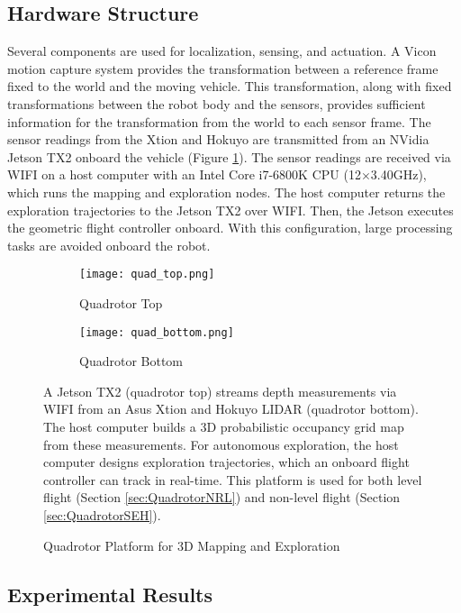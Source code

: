 \subsection{Hardware Structure}

Several components are used for localization, sensing, and actuation. A Vicon motion capture system provides the transformation between a reference frame fixed to the world and the moving vehicle. This transformation, along with fixed transformations between the robot body and the sensors, provides sufficient information for the transformation from the world to each sensor frame. The sensor readings from the Xtion and Hokuyo are transmitted from an NVidia Jetson TX2 onboard the vehicle (Figure \ref{fig:QuadrotorHardware}). The sensor readings are received via WIFI on a host computer with an Intel Core i7-6800K CPU (12$\times$3.40GHz), which runs the mapping and exploration nodes. The host computer returns the exploration trajectories to the Jetson TX2 over WIFI. Then, the Jetson executes the geometric flight controller onboard. With this configuration, large processing tasks are avoided onboard the robot.
		
\begin{figure}[!t]
\centering
    	\begin{subfigure}[t]{0.44\columnwidth}
           	\centering
          	\texttt{[image: quad\_top.png]}
        		\caption{Quadrotor Top}
    	\end{subfigure}
	\hspace*{0.05\columnwidth}
    	\begin{subfigure}[t]{0.44\columnwidth}
           	\centering
          	\texttt{[image: quad\_bottom.png]}
        		\caption{Quadrotor Bottom}
    	\end{subfigure}
	\caption{Quadrotor Platform for 3D Mapping and Exploration}
	\medskip
	\small
	A Jetson TX2 (quadrotor top) streams depth measurements via WIFI from an Asus Xtion and Hokuyo LIDAR (quadrotor bottom). The host computer builds a 3D probabilistic occupancy grid map from these measurements. For autonomous exploration, the host computer designs exploration trajectories, which an onboard flight controller can track in real-time. This platform is used for both level flight (Section \ref{sec:QuadrotorNRL}) and non-level flight (Section \ref{sec:QuadrotorSEH}).
	\label{fig:QuadrotorHardware}
\end{figure}

\subsection{Experimental Results}
                
